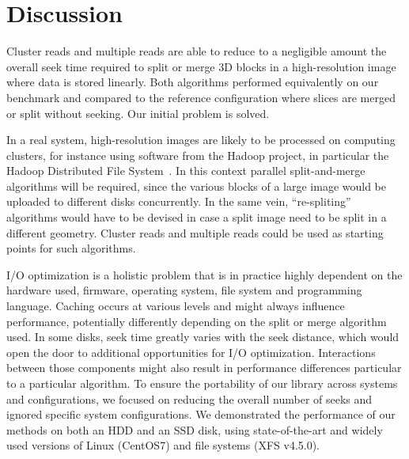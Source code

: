 \documentclass[10pt, conference, compsocconf]{IEEEtran}
\begin{document}
\newpage

\section{Discussion}
\label{sec:discussion}

Cluster reads and multiple reads are able to reduce to a negligible
amount the overall seek time required to split or merge 3D blocks in a
high-resolution image where data is stored linearly. Both algorithms
performed equivalently on our benchmark and compared to the reference
configuration where slices are merged or split without seeking. Our
initial problem is solved.

In a real system, high-resolution images are likely to be processed on
computing clusters, for instance using software from the Hadoop
project, in particular the Hadoop Distributed File
System~\cite{shvachko2010hadoop}. In this context parallel split-and-merge algorithms
will be required, since the various blocks of a large image would be
uploaded to different disks concurrently. In the same vein,
``re-spliting'' algorithms would have to be devised in case a split
image need to be split in a different geometry. Cluster reads and
multiple reads could be used as starting points for such algorithms.

I/O optimization is a holistic problem that is in practice highly
dependent on the hardware used, firmware, operating system, file
system and programming language. Caching occurs at various levels and
might always influence performance, potentially differently depending
on the split or merge algorithm used. In some disks, seek time greatly
varies with the seek distance, which would open the door to additional
opportunities for I/O optimization. Interactions between those
components might also result in performance differences particular to
a particular algorithm. To ensure the portability of our library
across systems and configurations, we focused on reducing the overall
number of seeks and ignored specific system configurations. We
demonstrated the performance of our methods on both an HDD and an SSD
disk, using state-of-the-art and widely used versions of Linux
(CentOS7) and file systems (XFS v4.5.0).
\end{document}
